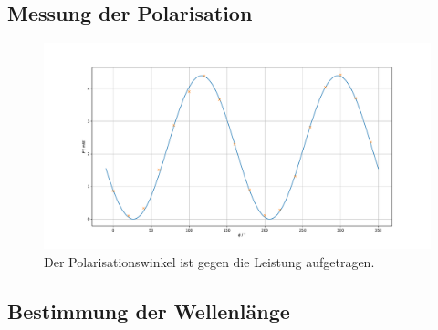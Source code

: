 \subsection{Messung der Polarisation}

\begin{figure}
    \centering
    \includegraphics[width=12cm]{plots/polarisation.pdf}
    \caption{Der Polarisationswinkel ist gegen die Leistung aufgetragen.}
    \label{fig:polarisation}
\end{figure}    

\subsection{Bestimmung der Wellenlänge}

